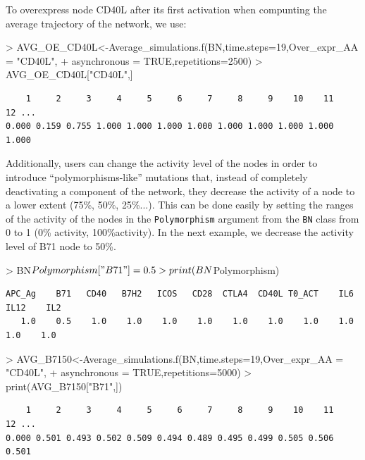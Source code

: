 \documentclass[a4paper]{article}
\begin{document}
To overexpress node CD40L after its first activation when compunting the average trajectory of the network, we use: 
\begin{Schunk}
\begin{Sinput}
> AVG_OE_CD40L<-Average_simulations.f(BN,time.steps=19,Over_expr_AA = "CD40L",
+                                    asynchronous = TRUE,repetitions=2500)
> AVG_OE_CD40L["CD40L",]
\end{Sinput}
\end{Schunk}
\begin{verbatim}
    1     2     3     4     5     6     7     8     9    10    11    12 ...
0.000 0.159 0.755 1.000 1.000 1.000 1.000 1.000 1.000 1.000 1.000 1.000
\end{verbatim}


Additionally, users can change the activity level of the nodes in order to introduce ``polymorphisms-like'' mutations that, instead of completely deactivating a component of the network, they decrease the activity of a node to a lower extent (75\%, 50\%, 25\%...). This can be done easily by setting the ranges of the activity of the nodes in the \texttt{Polymorphism} argument from the \texttt{BN} class from 0 to 1 (0\% activity, 100\%activity). In the next example, we decrease the activity level of B71 node to 50\%.
\begin{Schunk}
\begin{Sinput}
> BN$Polymorphism["B71"]=0.5
> print(BN$Polymorphism)
\end{Sinput}
\end{Schunk}
\begin{verbatim}
APC_Ag    B71   CD40   B7H2   ICOS   CD28  CTLA4  CD40L T0_ACT    IL6   IL12    IL2 
   1.0    0.5    1.0    1.0    1.0    1.0    1.0    1.0    1.0    1.0    1.0    1.0 
\end{verbatim}
\begin{Schunk}
\begin{Sinput}
> AVG_B7150<-Average_simulations.f(BN,time.steps=19,Over_expr_AA = "CD40L",
+                                    asynchronous = TRUE,repetitions=5000)
> print(AVG_B7150["B71",])
\end{Sinput}
\end{Schunk}
\begin{verbatim}
    1     2     3     4     5     6     7     8     9    10    11    12 ...
0.000 0.501 0.493 0.502 0.509 0.494 0.489 0.495 0.499 0.505 0.506 0.501
\end{verbatim}
\end{document}
